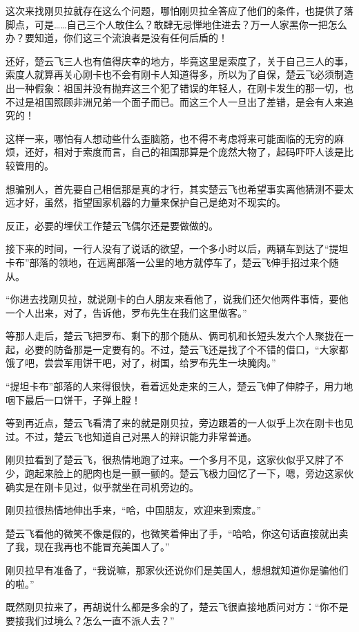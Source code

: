 这次来找刚贝拉就存在这么个问题，哪怕刚贝拉全答应了他们的条件，也提供了落脚点，可是……自己三个人敢住么？敢肆无忌惮地住进去？万一人家黑你一把怎么办？要知道，你们这三个流浪者是没有任何后盾的！

还好，楚云飞三人也有值得庆幸的地方，毕竟这里是索度了，关于自己三人的事，索度人就算再关心刚卡也不会有刚卡人知道得多，所以为了自保，楚云飞必须制造出一种假象：祖国并没有抛弃这三个犯了错误的年轻人，在刚卡发生的那一切，也不过是祖国照顾非洲兄弟一个面子而已。而这三个人一旦出了差错，是会有人来追究的！

这样一来，哪怕有人想动些什么歪脑筋，也不得不考虑将来可能面临的无穷的麻烦，还好，相对于索度而言，自己的祖国那算是个庞然大物了，起码吓吓人该是比较管用的。

想骗别人，首先要自己相信那是真的才行，其实楚云飞也希望事实离他猜测不要太远才好，虽然，指望国家机器的力量来保护自己是绝对不现实的。

反正，必要的埋伏工作楚云飞偶尔还是要做做的。

接下来的时间，一行人没有了说话的欲望，一个多小时以后，两辆车到达了“提坦卡布”部落的领地，在远离部落一公里的地方就停车了，楚云飞伸手招过来个随从。

“你进去找刚贝拉，就说刚卡的白人朋友来看他了，说我们还欠他两件事情，要他一个人出来，对了，告诉他，罗布先生在我们这里做客。”

等那人走后，楚云飞把罗布、剩下的那个随从、俩司机和长短头发六个人聚拢在一起，必要的防备那是一定要有的。不过，楚云飞还是找了个不错的借口，“大家都饿了吧，尝尝军用饼干吧，对了，树国，给罗布先生一块腌肉。”

“提坦卡布”部落的人来得很快，看着远处走来的三人，楚云飞伸了伸脖子，用力地咽下最后一口饼干，子弹上膛！

等到再近点，楚云飞看清了来的就是刚贝拉，旁边跟着的一人似乎上次在刚卡也见过。不过，楚云飞也知道自己对黑人的辩识能力非常普通。

刚贝拉看到了楚云飞，很热情地跑了过来。一个多月不见，这家伙似乎又胖了不少，跑起来脸上的肥肉也是一颤一颤的。楚云飞极力回忆了一下，嗯，旁边这家伙确实是在刚卡见过，似乎就坐在司机旁边的。

刚贝拉很热情地伸出手来，“哈，中国朋友，欢迎来到索度。”

楚云飞看他的微笑不像是假的，也微笑着伸出了手，“哈哈，你这句话直接就出卖了我，现在我再也不能冒充美国人了。”

刚贝拉早有准备了，“我说嘛，那家伙还说你们是美国人，想想就知道你是骗他们的啦。”

既然刚贝拉来了，再胡说什么都是多余的了，楚云飞很直接地质问对方：“你不是要接我们过境么？怎么一直不派人去？”

